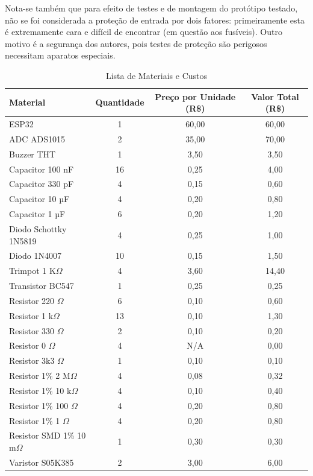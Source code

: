 Nota-se também que para efeito de testes e de montagem do protótipo testado, não se foi considerada a proteção de entrada por dois fatores: primeiramente esta é extremamente cara e difícil de encontrar (em questão aos fusíveis). Outro motivo é a segurança dos autores, pois testes de proteção são perigosos necessitam aparatos especiais.

\begin{table}[h!]
\centering
\caption{Lista de Materiais e Custos}
\label{tab:Bookofmaterials}
\begin{tabular}{|l|c|c|c|}
\hline
\textbf{Material} & \textbf{Quantidade} & \textbf{Preço por Unidade (R\$)} & \textbf{Valor Total (R\$)} \\ \hline
ESP32 & 1 & 60,00 & 60,00 \\ \hline
ADC ADS1015 & 2 & 35,00 & 70,00 \\ \hline
Buzzer THT & 1 & 3,50 & 3,50 \\ \hline
Capacitor 100 nF & 16 & 0,25 & 4,00 \\ \hline
Capacitor 330 pF & 4 & 0,15 & 0,60 \\ \hline
Capacitor 10 µF & 4 & 0,20 & 0,80 \\ \hline
Capacitor 1 µF & 6 & 0,20 & 1,20 \\ \hline
Diodo Schottky 1N5819 & 4 & 0,25 & 1,00 \\ \hline
Diodo 1N4007 & 10 & 0,15 & 1,50 \\ \hline
Trimpot 1 K$\Omega$ & 4 & 3,60 & 14,40 \\ \hline
Transistor BC547 & 1 & 0,25 & 0,25 \\ \hline
Resistor 220 $\Omega$ & 6 & 0,10 & 0,60 \\ \hline
Resistor 1 k$\Omega$ & 13 & 0,10 & 1,30 \\ \hline
Resistor 330 $\Omega$ & 2 & 0,10 & 0,20 \\ \hline
Resistor 0 $\Omega$ & 4 & N/A & 0,00 \\ \hline
Resistor 3k3 $\Omega$ & 1 & 0,10 & 0,10 \\ \hline
Resistor 1\% 2 M$\Omega$ & 4 & 0,08 & 0,32 \\ \hline
Resistor 1\% 10 k$\Omega$ & 4 & 0,10 & 0,40 \\ \hline
Resistor 1\% 100 $\Omega$ & 4 & 0,20 & 0,80 \\ \hline
Resistor 1\% 1 $\Omega$ & 4 & 0,20 & 0,80 \\ \hline
Resistor SMD 1\% 10 m$\Omega$ & 1 & 0,30 & 0,30 \\ \hline
Varistor S05K385 & 2 & 3,00 & 6,00 \\ \hline

\end{tabular}
\end{table}
